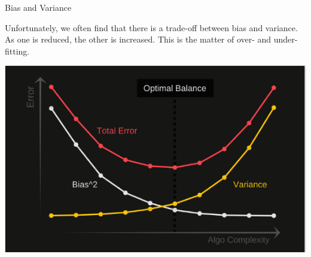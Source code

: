 \documentclass[11pt]{beamer}
\begin{document}
\begin{frame}{Bias and Variance}
\begin{tcolorbox}
Unfortunately, we often find that there is a trade-off between bias and variance. As one is reduced, the other is increased. This is the matter of over- and under-fitting.
\end{tcolorbox}
\begin{center}
\includegraphics[scale=.4]{../05-pictures/lesson-2-2_pic_15.png} 
\end{center}
\end{frame}
%
\end{document}

